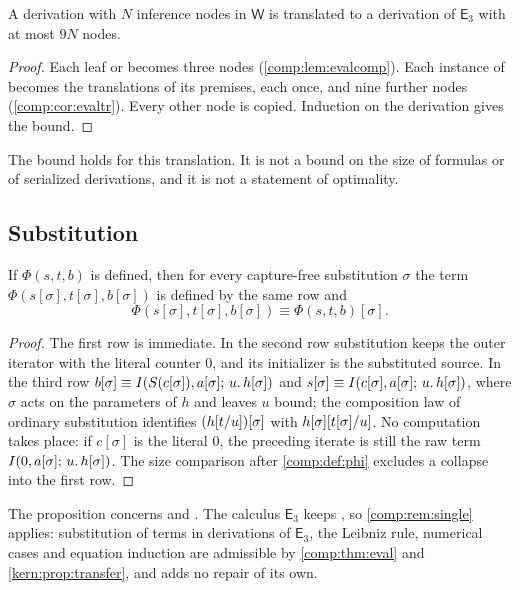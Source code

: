 \begin{corollary}
\label{comp:cor:evalnodes}
A derivation with $N$ inference nodes in $\mathsf{W}$ is translated to a
derivation of $\mathsf{E}_3$ with at most $9N$ nodes.
\end{corollary}

\begin{proof}
Each leaf  or  becomes three nodes
(\cref{comp:lem:evalcomp}). Each instance of  becomes the
translations of its premises, each once, and nine further nodes
(\cref{comp:cor:evaltr}). Every other node is copied. Induction on the
derivation gives the bound.
\end{proof}

The bound holds for this translation. It is not a bound on the size of
formulas or of serialized derivations, and it is not a statement of
optimality.

\subsection{Substitution}

\begin{proposition}
\label{comp:prop:phisubst}
If $\Phi(s,t,b)$ is defined, then for every capture-free substitution
$\sigma$ the term $\Phi(s[\sigma],t[\sigma],b[\sigma])$ is defined by the
same row and
\[
 \Phi(s[\sigma],t[\sigma],b[\sigma])\equiv\Phi(s,t,b)[\sigma].
\]
\end{proposition}

\begin{proof}
The first row is immediate. In the second row substitution keeps the outer
iterator with the literal counter $0$, and its initializer is the
substituted source. In the third row
$b[\sigma]\equiv I(S(c[\sigma]),a[\sigma];\,u.\,h[\sigma])$ and
$s[\sigma]\equiv I(c[\sigma],a[\sigma];\,u.\,h[\sigma])$, where $\sigma$ acts
on the parameters of $h$ and leaves $u$ bound; the composition law of
ordinary substitution identifies $(h[t/u])[\sigma]$ with
$h[\sigma][t[\sigma]/u]$. No computation takes place: if $c[\sigma]$
is the literal $0$, the preceding iterate is still the raw term
$I(0,a[\sigma];\,u.\,h[\sigma])$. The size comparison after
\cref{comp:def:phi} excludes a collapse into the first row.
\end{proof}

The proposition concerns  and . The calculus
$\mathsf{E}_3$ keeps , so \cref{comp:rem:single} applies:
substitution of terms in derivations of $\mathsf{E}_3$, the Leibniz rule,
numerical cases and equation induction are admissible by
\cref{comp:thm:eval} and \cref{kern:prop:transfer}, and
 adds no repair of its own.

